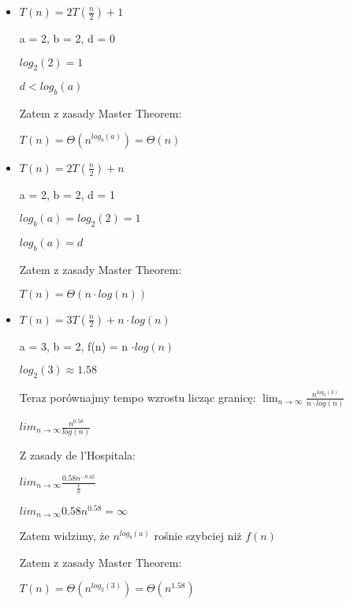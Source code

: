 \documentclass{article}
\begin{document}
    \begin{itemize}
        \item $T(n) = 2T(\frac{n}{2}) + 1$ \par
        a = 2, b = 2, d = 0 \par
        $log_2(2) = 1$ \par
        $d < log_b(a)$ \par
        Zatem z zasady Master Theorem: \par
        $T(n) = \Theta(n^{log_b(a)}) = \Theta(n)$ \par
        \item $T(n) = 2T(\frac{n}{2}) + n$ \par
        a = 2, b = 2, d = 1 \par
        $log_b(a) = log_2(2) = 1$ \par
        $log_b(a) = d$ \par
        Zatem z zasady Master Theorem: \par
        $T(n) = \Theta(n \cdot log(n))$ \par
        \item $T(n) = 3T(\frac{n}{2}) + n \cdot log(n)$ \par
        a = 3, b = 2, f(n) = n $\cdot log(n)$ \par
        $log_2(3) \approx 1.58$ \par
        Teraz porównajmy tempo wzrostu licząc granicę: $\lim_{n \to \infty} \frac{n^{log_2(3)}}{n \cdot log(n)}$ \par
        $lim_{n \to \infty} \frac{n^{0.58}}{log(n)}$ \par
        Z zasady de l'Hospitala: \par
        $lim_{n \to \infty} \frac{0.58n^{-0.42}}{\frac{1}{n}}$ \par
        $lim_{n \to \infty} 0.58n^{0.58} = \infty$ \par
        Zatem widzimy, że $n^{log_b(a)}$ rośnie szybciej niż $f(n)$ \par
        Zatem z zasady Master Theorem: \par
        $T(n) = \Theta(n^{log_2(3)}) = \Theta(n^{1.58})$ \par
        
    \end{itemize}
\end{document}
